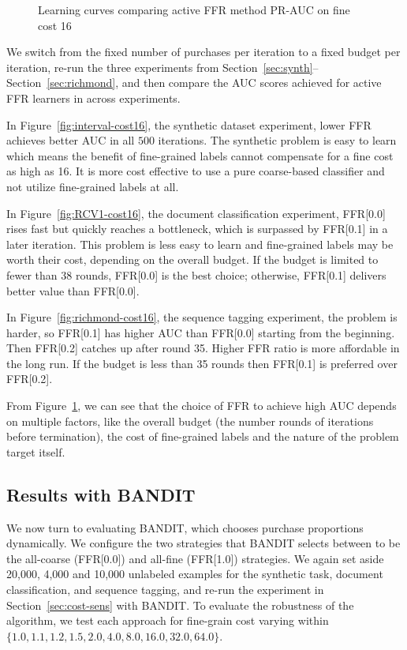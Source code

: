 \begin{figure}[tb]
{    	\label{fig:richmond-cost16}
    }
    \caption{Learning curves comparing active FFR method PR-AUC on fine cost 16}
	\label{fig:cost16}
\end{figure}

We switch from the fixed number of purchases per iteration to a fixed budget per iteration,
re-run the three experiments from Section~\ref{sec:synth}--Section~\ref{sec:richmond}, and then
compare the AUC scores achieved for active FFR learners in across experiments.

In Figure~\ref{fig:interval-cost16}, the synthetic dataset experiment, lower FFR
achieves better AUC in all $500$ iterations. The synthetic problem is easy to learn
which means the benefit of fine-grained labels cannot compensate for a fine cost as high as 16.
It is more cost effective to use a pure coarse-based classifier and not utilize fine-grained labels
at all.

In Figure~\ref{fig:RCV1-cost16}, the document classification experiment, FFR[0.0] rises fast
but quickly reaches a bottleneck, which is surpassed by FFR[0.1] in a later iteration. This problem
is less easy to learn and fine-grained labels may be worth their cost, depending on the overall budget.
If the budget is limited to fewer than 38 rounds, FFR[0.0] is the best choice; otherwise,
FFR[0.1] delivers better value than FFR[0.0].

\clearpage

In Figure~\ref{fig:richmond-cost16}, the sequence tagging experiment, the problem is harder,
so FFR[0.1]
has higher AUC than FFR[0.0] starting from the beginning. Then FFR[0.2] catches up after round 35. Higher FFR ratio
is more affordable in the long run. If the budget is less than 35 rounds then FFR[0.1] is preferred over FFR[0.2].

From Figure~\ref{fig:cost16}, we can see that the choice of FFR to achieve high AUC depends on multiple factors,
like the overall budget (the number rounds of iterations before termination), the cost of fine-grained labels and
the nature of the problem target itself.

\subsection{Results with BANDIT}

We now turn to evaluating BANDIT, which chooses purchase proportions dynamically.  We configure the two strategies
that BANDIT selects between to be the all-coarse (FFR[0.0]) and all-fine (FFR[1.0]) strategies.
We again set aside 20,000, 4,000 and 10,000 unlabeled examples for the synthetic task, document classification, 
and sequence tagging, and re-run the experiment in Section~\ref{sec:cost-sens} with
BANDIT. To evaluate the robustness of the algorithm, we test each approach for fine-grain cost varying within 
$\{1.0, 1.1, 1.2, 1.5, 2.0, 4.0, 8.0, 16.0, 32.0, 64.0\}$.


